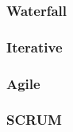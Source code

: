 \begin{frame}
\frametitle{Waterfall}

\end{frame}

\begin{frame}
\frametitle{Iterative}

\end{frame}

\begin{frame}
\frametitle{Agile}

\end{frame}

\begin{frame}
\frametitle{SCRUM}

\end{frame}
